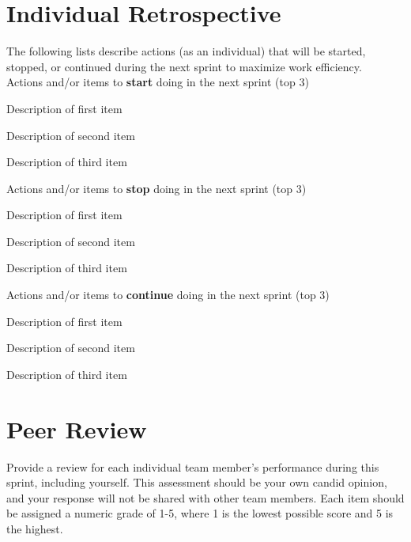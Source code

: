 \documentclass{article}
\begin{document}
\pagebreak

\section{Individual Retrospective}
The following lists describe actions (as an individual) that will be started, stopped, or continued during the next sprint to maximize work efficiency. \\

Actions and/or items to \textbf{start} doing in the next sprint (top 3)
\begin{itemize}
\begin{item}
Description of first item
\end{item}
\begin{item}
Description of second item
\end{item}
\begin{item}
Description of third item
\end{item}
\end{itemize}

Actions and/or items to \textbf{stop} doing in the next sprint (top 3)
\begin{itemize}
\begin{item}
Description of first item
\end{item}
\begin{item}
Description of second item
\end{item}
\begin{item}
Description of third item
\end{item}
\end{itemize}

Actions and/or items to \textbf{continue} doing in the next sprint (top 3)
\begin{itemize}
\begin{item}
Description of first item
\end{item}
\begin{item}
Description of second item
\end{item}
\begin{item}
Description of third item
\end{item}
\end{itemize}


\section{Peer Review}
Provide a review for each individual team member's performance during this sprint, including yourself. This assessment should be your own candid opinion, and your response will not be shared with other team members. Each item should be assigned a numeric grade of 1-5, where 1 is the lowest possible score and 5 is the highest. \\
\end{document}
